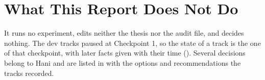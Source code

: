 \section{What This Report Does Not Do}
\label{sec:limits-of-report}

It runs no experiment, edits neither the thesis nor the audit file, and decides
nothing. The dev tracks paused at Checkpoint 1, so the state of a track is the one of
that checkpoint, with later facts given with their time (). Several
decisions belong to Hani and are listed in
 with the options and recommendations the tracks
recorded.
